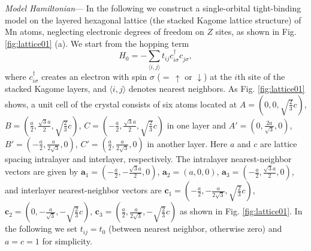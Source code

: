 \documentclass[letter,twocolumn,amsmath,amssymb,superscriptaddress]{jpsj3}
\newcommand{\vV}{\bm{V}}
\newcommand{\vS}{\bm{S}}
\newcommand{\va}{\bm{a}}
\newcommand{\vc}{\bm{c}}
\begin{document}










{\it Model Hamiltonian}---
In the following we construct a single-orbital tight-binding model on the layered hexagonal lattice (the stacked Kagome lattice structure) of Mn atoms, neglecting electronic degrees of freedom on $Z$ sites, as shown in Fig. \ref{fig:lattice01} (a).
We start from the hopping term
\begin{equation}
H_0=-\sum_{\langle i,j\rangle}t_{ij}c_{i\sigma}^{\dag}c_{j\sigma}^{},
\end{equation}
where $c^{\dag}_{i\sigma}$ creates an electron with spin $\sigma$ ($=\,\uparrow$ or $\downarrow$) at the $i$th site of the stacked Kagome layers, and $\langle i,j\rangle$ denotes nearest neighbors.
As Fig. \ref{fig:lattice01} shows, a unit cell of the crystal consists of six atoms located at 
$A=(0,0,\sqrt{\frac{2}{3}}c)$, $B=(\frac{a}{2},\frac{\sqrt{3}a}{2},\sqrt{\frac{2}{3}}c)$,  $C=(-\frac{a}{2},\frac{\sqrt{3}a}{2},\sqrt{\frac{2}{3}}c)$ in one layer and 
$A'=(0,\frac{2a}{\sqrt{3}},0)$, $B'=(-\frac{a}{2},\frac{a}{2\sqrt{3}},0)$,  $C'=(\frac{a}{2},\frac{a}{2\sqrt{3}},0)$ in another layer. Here $a$ and $c$ are lattice spacing intralayer and interlayer, respectively.
The intralayer nearest-neighbor vectors are given by 
$\va_1=(-\frac{a}{2},-\frac{\sqrt{3}a}{2},0)$, $\va_2=(a,0,0)$, $\va_3=(-\frac{a}{2},\frac{\sqrt{3}a}{2},0)$,
and interlayer nearest-neighbor vectors are
$\vc_1=(-\frac{a}{2},-\frac{a}{2\sqrt{3}},\sqrt{\frac{2}{3}}c)$, $\vc_2=(0,-\frac{a}{\sqrt{3}},-\sqrt{\frac{2}{3}}c)$, $\vc_3=(\frac{a}{2},\frac{a}{2\sqrt{3}},-\sqrt{\frac{2}{3}}c)$ as shown in Fig. \ref{fig:lattice01}.
In the following we set $t_{ij}=t_0$ (between nearest neighbor, otherwise zero) and $a=c=1$ for simplicity.
\end{document}
